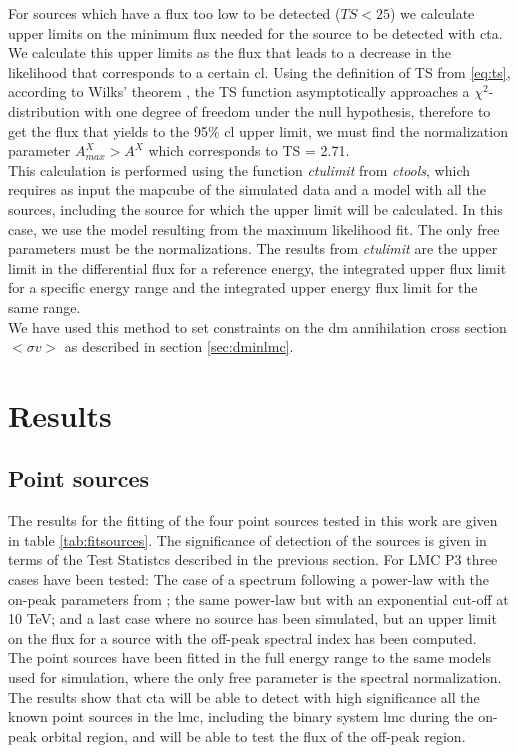 \documentclass[main.tex]{subfiles}
\begin{document}
For sources which have a flux too low to be detected ($TS < 25$) we calculate upper limits on the minimum flux needed for the source to be detected with \gls{cta}. We calculate this upper limits as the flux that leads to a decrease in the likelihood that corresponds to a certain \gls{cl}. Using the definition of TS from \ref{eq:ts}, according to Wilks' theorem \cite{wilks1938}, the TS function asymptotically approaches a $\chi^2$-distribution with one degree of freedom under the null hypothesis, therefore to get the flux that yields to the 95\% \gls{cl} upper limit, we must find the normalization parameter $A^X_{max} > A^{X}$ which corresponds to TS = 2.71.\\
This calculation is performed using the function \textit{ctulimit} from \textit{ctools}, which requires as input the mapcube of the simulated data and a model with all the sources, including the source for which the upper limit will be calculated. In this case, we use the model resulting from the maximum likelihood fit. The only free parameters must be the normalizations. The results from \textit{ctulimit} are the upper limit in the differential flux for a reference energy, the integrated upper flux limit for a specific energy range and the integrated upper energy flux limit for the same range.\\
We have used this method to set constraints on the \gls{dm} annihilation cross section $<\sigma v>$ as described in section \ref{sec:dminlmc}.

\section{Results}\label{sec:results}
        
\subsection{Point sources}

The results for the fitting of the four point sources tested in this work are given in table \ref{tab:fitsources}. The significance of detection of the sources is given in terms of the Test Statistcs described in the previous section. For LMC P3 three cases have been tested: The case of a spectrum following a power-law with the on-peak parameters from \cite{2017HESSLMCP3}; the same power-law but with an exponential cut-off at 10 TeV; and a last case where no source has been simulated, but an upper limit on the flux for a source with the off-peak spectral index has been computed.\\
The point sources have been fitted in the full energy range to the same models used for simulation, where the only free parameter is the spectral normalization.
The results show that \gls{cta} will be able to detect with high significance all the known point sources in the \gls{lmc}, including the binary system \gls{lmc} during the on-peak orbital region, and will be able to test the flux of the off-peak region. 
\end{document}
